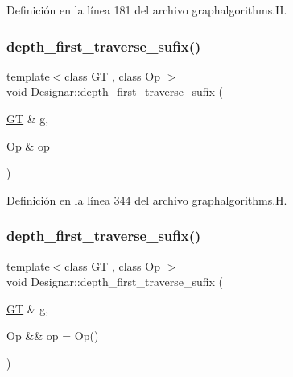 Definición en la línea 181 del archivo graphalgorithms.\+H.

\mbox{\label{namespace_designar_a91a3b6c7321dec6f2d9579721af465a1}} 
\subsubsection{\texorpdfstring{depth\+\_\+first\+\_\+traverse\+\_\+sufix()}{depth\_first\_traverse\_sufix()}\hspace{0.1cm}{\footnotesize\ttfamily [1/2]}}
{\footnotesize\ttfamily template$<$class GT , class Op $>$ \\
void Designar\+::depth\+\_\+first\+\_\+traverse\+\_\+sufix (\begin{DoxyParamCaption}\item[{\hyperlink{demo-buildgraph_8_c_a3001c40d2c31ca87ed96cd7d1334a55e}{GT} \&}]{g,  }\item[{Op \&}]{op }\end{DoxyParamCaption})}



Definición en la línea 344 del archivo graphalgorithms.\+H.

\mbox{\label{namespace_designar_ae742525c8bae623299150bcbcc317d6c}} 
\subsubsection{\texorpdfstring{depth\+\_\+first\+\_\+traverse\+\_\+sufix()}{depth\_first\_traverse\_sufix()}\hspace{0.1cm}{\footnotesize\ttfamily [2/2]}}
{\footnotesize\ttfamily template$<$class GT , class Op $>$ \\
void Designar\+::depth\+\_\+first\+\_\+traverse\+\_\+sufix (\begin{DoxyParamCaption}\item[{\hyperlink{demo-buildgraph_8_c_a3001c40d2c31ca87ed96cd7d1334a55e}{GT} \&}]{g,  }\item[{Op \&\&}]{op = {\ttfamily Op()} }\end{DoxyParamCaption})}



